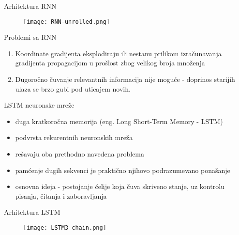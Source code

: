 \documentclass[table]{beamer}
\begin{document}
\begin{frame}{Arhitektura RNN}
\begin{figure}[htp]
    \centering
    \texttt{[image: RNN-unrolled.png]}
\end{figure}
    
\end{frame}

\begin{frame}{Problemi sa RNN}

\begin{enumerate}
    \item \alert{Koordinate gradijenta eksplodiraju ili nestanu} prilikom izračunavanja gradijenta propagacijom u prošlost zbog velikog broja množenja
    \item \alert{Dugoročno čuvanje relevantnih informacija nije moguće} - doprinos starijih ulaza se brzo gubi pod uticajem novih. 
\end{enumerate}

\end{frame}

\begin{frame}{LSTM neuronske mreže}

\begin{itemize}
    \item duga kratkoročna memorija (eng. Long Short-Term Memory - LSTM)
    \item podvrsta rekurentnih neuronskih mreža
    \item rešavaju oba prethodno navedena problema
    \item pamćenje dugih sekvenci je praktično njihovo podrazumevano ponašanje
    \item osnovna ideja - postojanje ćelije koja čuva skriveno stanje, uz kontrolu pisanja, čitanja i zaboravljanja
\end{itemize}
    
\end{frame}

\begin{frame}{Arhitektura LSTM}
\begin{figure}
    \centering
    \texttt{[image: LSTM3-chain.png]}
\end{figure}
    
\end{frame}
\end{document}
